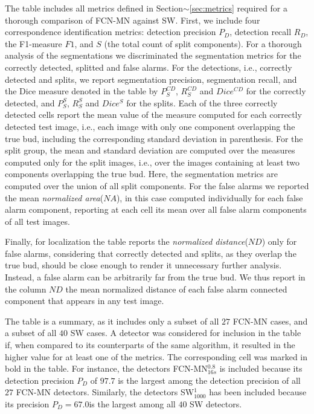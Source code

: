 \documentclass[a4paper,authoryear,review]{elsarticle}
\begin{document}
The table includes all metrics defined in Section$\sim$\ref{sec:metrics} required for a thorough comparison of FCN-MN against SW. First, we include four correspondence identification metrics: detection precision $P_D$, detection recall $R_D$, the F1-measure  $F1$, and $S$ (the total count of split components). 
%
For a thorough analysis of the segmentations we discriminated the segmentation metrics for the correctly detected, splitted and false alarms. For the detections, i.e., correctly detected and splits, we report segmentation precision,  segmentation recall, and the Dice measure denoted in the table by $P_S^{CD}$, $R_S^{CD}$ and $Dice^{CD}$ for the correctly detected, and $P_S^S$, $R_S^S$ and $Dice^S$ for the splits.  Each of the three correctly detected cells report the mean value of the measure computed for each correctly detected test image, i.e., each image with only one component overlapping the true bud, including the corresponding standard deviation  in parenthesis. For the split group, the mean and standard deviation are computed over the measures computed only for the split images, i.e., over the images containing at least two components overlapping the true bud. Here, the segmentation metrics are computed over the union of all split components. 
%
For the false alarms we reported the mean \emph{normalized area}($NA$), in this case computed individually for each false alarm component, reporting at each cell its mean over all false alarm components of all test images. 

Finally, for localization the table reports the \emph{normalized distance}($ND$) only for false alarms, considering that correctly detected and splits, as they overlap the true bud, should be close enough to render it unnecessary further analysis. Instead, a false alarm can be arbitrarily far from the true bud.  We thus report in the column $ND$ the mean normalized distance of each false alarm connected component that appears in any test image.

The table is a summary, as it includes only a subset of all $27$ FCN-MN cases, and a subset of all $40$ SW cases. A detector was considered for inclusion in the table if, when compared to its counterparts of the same algorithm, it resulted in the higher value for at least one of the metrics. The corresponding cell was marked in bold in the table. For instance, the detectors FCN-MN$_{16s}^{0.8}$ is included because its detection precision $P_D$ of $97.7$ is the largest among the detection precision of all $27$ FCN-MN detectors. Similarly, the detectors SW$_{1000}^1$ has been included because its precision $P_D = 67.0$is the largest among all $40$ SW detectors. 
\end{document}
